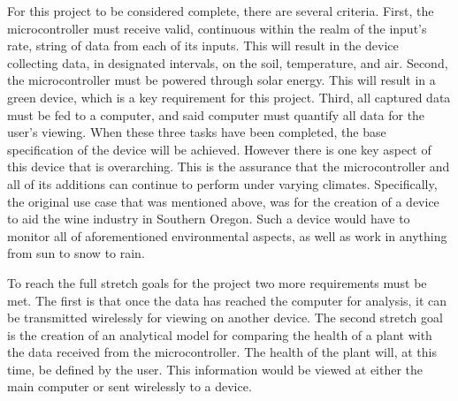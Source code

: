 \documentclass[IEEEtran,letterpaper,10pt,titlepage,fleqn,draftclsnofoot,onecolumn]{article}
\begin{document}
For this project to be considered complete, there are several criteria. First, the microcontroller must receive valid, continuous within the realm of the input’s rate, string of data from each of its inputs. This will result in the device collecting data, in designated intervals, on the soil, temperature, and air. Second, the microcontroller must be powered through solar energy. This will result in a green device, which is a key requirement for this project. Third, all captured data must be fed to a computer, and said computer must quantify all data for the user’s viewing. When these three tasks have been completed, the base specification of the device will be achieved. However there is one key aspect of this device that is overarching. This is the assurance that the microcontroller and all of its additions can continue to perform under varying climates. Specifically, the original use case that was mentioned above, was for the creation of a device to aid the wine industry in Southern Oregon. Such a device would have to monitor all of aforementioned environmental aspects, as well as work in anything from sun to snow to rain.

\vspace{5mm}

To reach the full stretch goals for the project two more requirements must be met. The first is that once the data has reached the computer for analysis, it can be transmitted wirelessly for viewing on another device. The second stretch goal is the creation of an analytical model for comparing the health of a plant with the data received from the microcontroller. The health of the plant will, at this time, be defined by the user. This information would be viewed at either the main computer or sent wirelessly to a device. 
\end{document}
